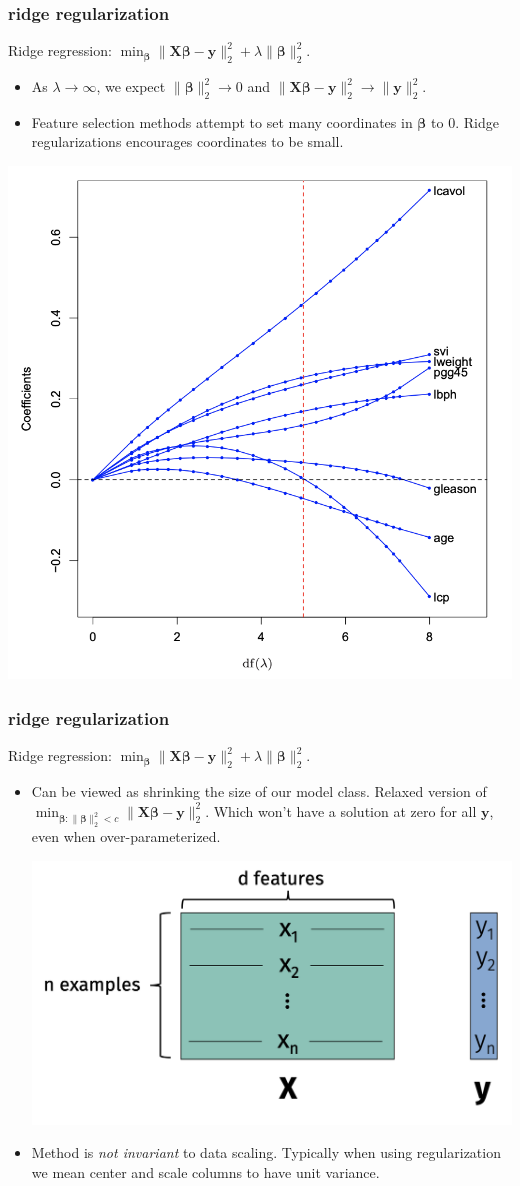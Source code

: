 \documentclass[handout,compress]{beamer}
\newcommand{\bs}[1]{\boldsymbol{#1}}
\newcommand{\bv}[1]{\mathbf{#1}}
\begin{document}
\begin{frame}
	\frametitle{ridge regularization}
	\begin{center}
		Ridge regression: $\min_{\bs{\beta}} \|\bv{X}\bs{\beta} - \bv{y}\|_2^2 + \lambda \|\bs{\beta}\|_2^2$.
	\end{center}
\begin{itemize}
	\item As $\lambda \rightarrow \infty$, we expect $\|\bs{\beta}\|_2^2 \rightarrow 0$ and $\|\bv{X}\bs{\beta} - \bv{y}\|_2^2 \rightarrow \|\bv{y}\|_2^2$.
	\item Feature selection methods attempt to set many coordinates in $\bs{\beta}$ to 0. Ridge regularizations encourages coordinates to be small. 
\end{itemize}
\vspace{-1em}
	\begin{center}
	\includegraphics[width=.4\textwidth]{ridge_coeff.png}
	\end{center}
\end{frame}

\begin{frame}
	\frametitle{ridge regularization}
	\begin{center}
		Ridge regression: $\min_{\bs{\beta}} \|\bv{X}\bs{\beta} - \bv{y}\|_2^2 + \lambda \|\bs{\beta}\|_2^2$.
	\end{center}
	\begin{itemize}
		\item Can be viewed as shrinking the size of our model class. Relaxed version of $\min_{\bs{\beta}: \|\bs{\beta}\|_2^2 < c} \|\bv{X}\bs{\beta} - \bv{y}\|_2^2$. Which won't have a solution at zero for all $\bv{y}$, even when over-parameterized.
		
		\includegraphics[width=.5\textwidth]{overparameterized.png}
		
		\item Method is \emph{not invariant} to data scaling. Typically when using regularization we mean center and scale columns to have unit variance.
	\end{itemize}
\end{frame}
\end{document}
